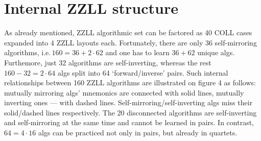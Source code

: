 \documentclass[a4paper]{article}
\begin{document}
\section*{Internal ZZLL structure}
%

As already mentioned, ZZLL algorithmic set can be factored as 40 COLL cases expanded into 4 ZZLL layouts each. Fortunately, there are only 36 self-mirroring algorithms, i.e.\,$160 = 36 + 2\cdot 62$ and one has to learn $36+62$ unique algs. Furthemore, just 32 algorithms are self-inverting, whereas the rest $160 - 32 = 2\cdot 64$ algs split into 64 `forward/inverse' pairs. Such internal relationships between 160 ZZLL algorithms are illustrated on figure 4 as follows: mutually mirroring algs' mnemonics are connected with solid lines, mutually inverting ones --- with dashed lines. Self-mirroring/self-inverting algs miss their solid/dashed lines respectively. The 20 disconnected algorithms are self-inverting and self-mirroring at the same time and cannot be learned in pairs. In contrast, $64 = 4\cdot 16$ algs can be practiced not only in pairs, but already in quartets.
\end{document}
